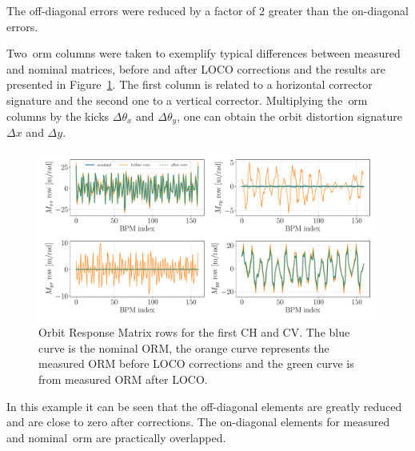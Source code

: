 The off-diagonal errors were reduced by a factor of 2 greater than the on-diagonal errors.

Two~\gls{orm} columns were taken to exemplify typical differences between measured and nominal matrices, before and after LOCO corrections and the results are presented in Figure~\ref{fig:orm_rows}. The first column is related to a horizontal corrector signature and the second one to a vertical corrector. Multiplying the~\gls{orm} columns by the kicks $\Delta\theta_x$ and $\Delta\theta_y$, one can obtain the orbit distortion signature $\Delta x$ and $\Delta y$.
\begin{figure}[h!]
\centering
\includegraphics[width=1.0\textwidth]{figures/nominal_measured_after_before_loco_big.pdf}
\caption{Orbit Response Matrix rows for the first CH and CV. The blue curve is the nominal ORM, the orange curve represents the measured ORM before LOCO corrections and the green curve is from measured ORM after LOCO.}
\label{fig:orm_rows}
\end{figure}

In this example it can be seen that the off-diagonal elements are greatly reduced and are close to zero after corrections. The on-diagonal elements for measured and nominal~\gls{orm} are practically overlapped.

